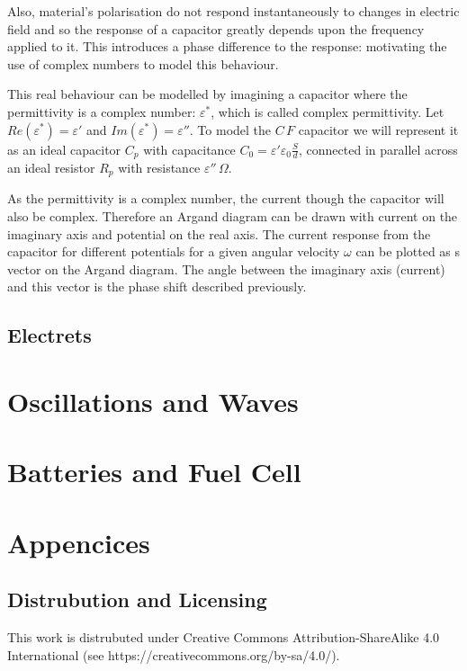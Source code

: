 \documentclass[11pt,a4paper]{report}
\begin{document}
Also, material's polarisation do not respond instantaneously to changes in electric field and so the response of a capacitor greatly depends upon the frequency applied to it. This introduces a phase difference to the response: motivating the use of complex numbers to model this behaviour.

This real behaviour can be modelled by imagining a capacitor where the permittivity is a complex number: $\varepsilon^*$, which is called complex permittivity. Let $Re(\varepsilon^*)=\varepsilon'$ and $Im(\varepsilon^*)=\varepsilon''$. To model the $C \, F$ capacitor we will represent it as an ideal capacitor $C_p$ with capacitance $C_0 =\varepsilon'\varepsilon_0\frac{S}{d}$, connected in parallel across an ideal resistor $R_p$ with resistance $\varepsilon'' \, \Omega$.

As the permittivity is a complex number, the current though the capacitor will also be complex. Therefore an Argand diagram can be drawn with current on the imaginary axis and potential on the real axis. The current response from the capacitor for different potentials for a given angular velocity $\omega$ can be plotted as s vector on the Argand diagram. The angle between the imaginary axis (current) and this vector is the phase shift described previously.

\section{Electrets}

\chapter{Oscillations and Waves}

\chapter{Batteries and Fuel Cell}

\chapter{Appencices}
\section{Distrubution and Licensing}
This work is distrubuted under Creative Commons Attribution-ShareAlike 4.0
International (see https://creativecommons.org/by-sa/4.0/).
\end{document}
